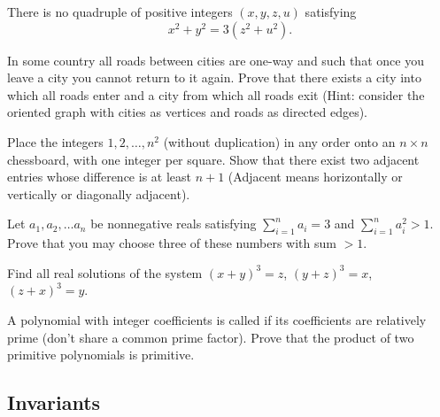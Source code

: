 \documentclass[12pt]{article}
\begin{document}
        \begin{exercise}
            There is no quadruple of positive integers $(x, y, z, u)$ satisfying 
            \[x^2 + y^2 = 3(z^{2} + u^{2}).\]
        \end{exercise}
        
        \begin{exercise}
            In some country all roads between cities are one-way and such that once you leave a city you cannot return to it again. Prove that there exists a city into which all roads enter and a city from which all roads exit (Hint: consider the oriented graph with cities as vertices and roads as directed edges).  
        \end{exercise}
        
        \begin{exercise}
            Place the integers $1, 2, \ldots, n^2$ (without duplication) in any order onto an $n \times n$ chessboard, with one integer per square. Show that there exist two adjacent entries whose difference is at least $n + 1$ (Adjacent means horizontally or vertically or diagonally adjacent). 
        \end{exercise}
        
        \begin{exercise}
            Let $a_{1}, a_{2}, \ldots a_{n}$ be nonnegative reals satisfying $\sum_{i = 1}^{n} a_{i} = 3$ and $\sum_{i = 1}^{n} a_{i}^{2} > 1$. Prove that you may choose three of these numbers with sum $> 1$.
        \end{exercise}
        
        \begin{exercise}
            Find all real solutions of the system $(x + y)^{3} = z$, $(y + z)^{3} = x$, $(z + x)^{3} = y$. 
        \end{exercise}
        
        \begin{exercise}
        A polynomial with integer coefficients is called  if its coefficients are relatively prime (don't share a common prime factor). Prove that the product of two primitive polynomials is primitive.
        \end{exercise}

    \subsection{Invariants}
\end{document}
